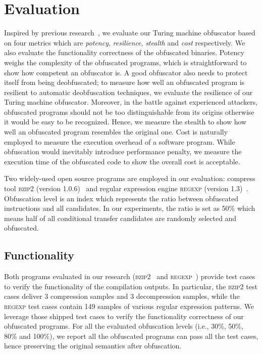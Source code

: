 \chapter{Evaluation}
\label{sec:evaluation}
Inspired by previous research~\cite{Collberg, Ma, Maieee}, we evaluate our
Turing machine obfuscator based on four metrics which are
\textit{potency}, \textit{resilience}, \textit{stealth} and \textit{cost}
respectively. We also evaluate the functionality correctness of the obfuscated
binaries. Potency weighs the complexity of the obfuscated programs, which is
straightforward to show how competent an obfuscator is. A good obfuscator also
needs to protect itself from being deobfuscated; to measure how well an
obfuscated program is resilient to automatic deobfuscation techniques, we
evaluate the resilience of our Turing machine obfuscator. Moreover, in the
battle against experienced attackers, obfuscated programs should not be too
distinguishable from its origins otherwise it would be easy to be recognized.
Hence, we measure the stealth to show how well an obfuscated program resembles
the original one. Cost is naturally employed to measure the execution overhead
of a software program. While obfuscation would inevitably introduce performance
penalty, we measure the execution time of the obfuscated code to show the
overall cost is acceptable.

Two widely-used open source programs are employed in our evaluation: compress
tool \textsc{bzip2} (version 1.0.6)~\cite{bzip2} and regular expression engine
\textsc{regexp} (version 1.3)~\cite{slre}. Obfuscation level is an index which
represents the ratio between obfuscated instructions and all candidates. In our
experiments, the ratio is set as 50\% which means half of all conditional
transfer candidates are randomly selected and obfuscated.

\section{Functionality}
Both programs evaluated in our research (\textsc{bzip2}~\cite{bzip2} and
\textsc{regexp}~\cite{slre}) provide test cases to verify the functionality of
the compilation outputs. In particular, the \textsc{bzip2} test cases deliver 3
compression samples and 3 decompression samples, while the \textsc{regexp} test
cases contain 149 samples of various regular expression patterns. We leverage
those shipped test cases to verify the functionality correctness of our
obfuscated programs. For all the evaluated obfuscation levels (i.e., 30\%, 50\%,
80\% and 100\%), we report all the obfuscated programs can pass all the test
cases, hence preserving the original semantics after obfuscation.

